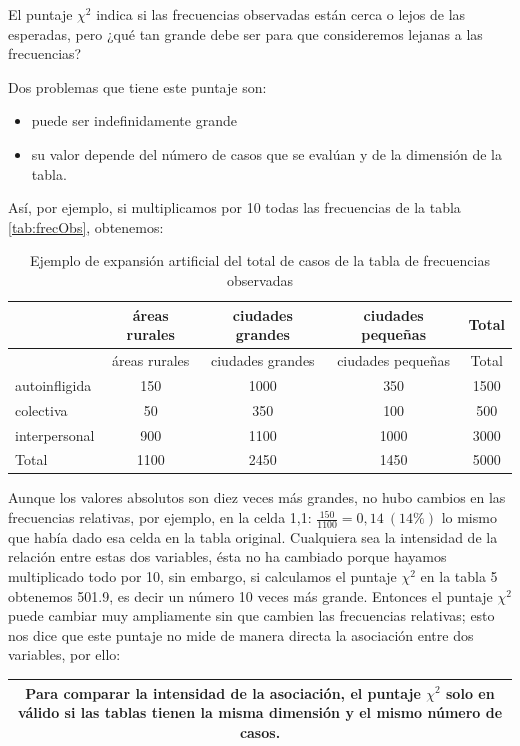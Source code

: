 \documentclass[]{book}
\providecommand{\tightlist}{%
  \setlength{\itemsep}{0pt}\setlength{\parskip}{0pt}}
\begin{document}
El puntaje \(\chi^{2}\) indica si las frecuencias observadas están cerca o lejos de las esperadas, pero ¿qué tan grande debe ser para que consideremos lejanas a las frecuencias?

Dos problemas que tiene este puntaje son:

\begin{itemize}
\tightlist
\item
  puede ser indefinidamente grande
\item
  su valor depende del número de casos que se evalúan y de la dimensión de la tabla.
\end{itemize}

Así, por ejemplo, si multiplicamos por 10 todas las frecuencias de la tabla \ref{tab:frecObs}, obtenemos:

\begin{longtable}[]{@{}lcccc@{}}
\caption{\label{tab:unnamed-chunk-138}Ejemplo de expansión artificial del total de casos de la tabla de frecuencias observadas}\tabularnewline
\toprule
& áreas rurales & ciudades grandes & ciudades pequeñas & Total\tabularnewline
\midrule
\endfirsthead
\toprule
& áreas rurales & ciudades grandes & ciudades pequeñas & Total\tabularnewline
\midrule
\endhead
autoinfligida & 150 & 1000 & 350 & 1500\tabularnewline
colectiva & 50 & 350 & 100 & 500\tabularnewline
interpersonal & 900 & 1100 & 1000 & 3000\tabularnewline
Total & 1100 & 2450 & 1450 & 5000\tabularnewline
\bottomrule
\end{longtable}

Aunque los valores absolutos son diez veces más grandes, no hubo cambios en las frecuencias relativas, por ejemplo, en la celda 1,1: \(\frac{150}{1100} = 0,14\ (14\%)\) lo mismo que había dado esa celda en la tabla original. Cualquiera sea la intensidad de la relación entre estas dos variables, ésta no ha cambiado porque hayamos multiplicado todo por 10, sin embargo, si calculamos el puntaje \(\chi^{2}\) en la tabla 5 obtenemos 501.9, es decir un número 10 veces más grande. Entonces el puntaje \(\chi^{2}\) puede cambiar muy ampliamente sin que cambien las frecuencias relativas; esto nos dice que este puntaje no mide de manera directa la asociación entre dos variables, por ello:

\begin{longtable}[]{@{}c@{}}
\toprule
\endhead
\begin{minipage}[t]{0.97\columnwidth}\centering
Para comparar la intensidad de la asociación, el puntaje \(\chi^{2}\) solo en válido si las tablas tienen la misma dimensión y el mismo número de casos.\strut
\end{minipage}\tabularnewline
\bottomrule
\end{longtable}
\end{document}
